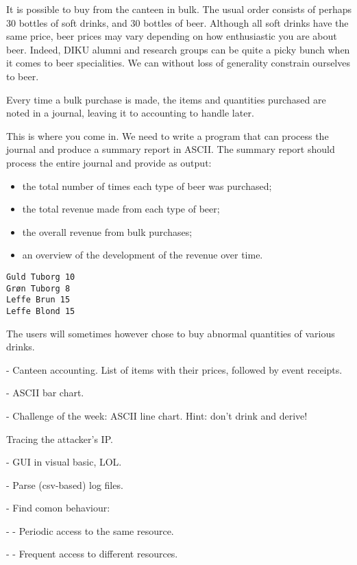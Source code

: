 It is possible to buy from the canteen in bulk. The usual order consists of
perhaps 30 bottles of soft drinks, and 30 bottles of beer. Although all soft
drinks have the same price, beer prices may vary depending on how enthusiastic
you are about beer. Indeed, DIKU alumni and research groups can be quite a
picky bunch when it comes to beer specialities. We can without loss of
generality constrain ourselves to beer.

Every time a bulk purchase is made, the items and quantities purchased are
noted in a journal, leaving it to accounting to handle later.

This is where you come in. We need to write a program that can process the
journal and produce a summary report in ASCII. The summary report should
process the entire journal and provide as output:

\begin{itemize}

\item the total number of times each type of beer was purchased;

\item the total revenue made from each type of beer;

\item the overall revenue from bulk purchases;

\item an overview of the development of the revenue over time.

\end{itemize}

\begin{verbatim}
Guld Tuborg 10
Grøn Tuborg 8
Leffe Brun 15
Leffe Blond 15
\end{verbatim}

The users will
sometimes however chose to buy abnormal quantities of various drinks.

- Canteen accounting. List of items with their prices, followed by event
  receipts.

- ASCII bar chart.

- Challenge of the week: ASCII line chart. Hint: don't drink and derive!

Tracing the attacker's IP.

- GUI in visual basic, LOL.

- Parse (csv-based) log files.

- Find comon behaviour:

- - Periodic access to the same resource.

- - Frequent access to different resources.
